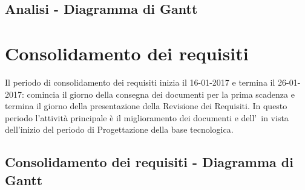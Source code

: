 \documentclass[PianoDiProgetto.tex]{subfiles}
\begin{document}
\begin{landscape}
\subsection{Analisi - Diagramma di Gantt}
\end{landscape}	
\section{Consolidamento dei requisiti}
Il periodo di consolidamento dei requisiti inizia il 16-01-2017 e termina il 26-01-2017: comincia il giorno della consegna dei documenti per la prima scadenza e termina il giorno della presentazione della Revisione dei Requisiti. In questo periodo l'attività principale è il miglioramento dei documenti e dell'\adr\ in vista dell'inizio del periodo di Progettazione della base tecnologica.
\subsection{Consolidamento dei requisiti - Diagramma di Gantt}

\newpage
\end{document}
